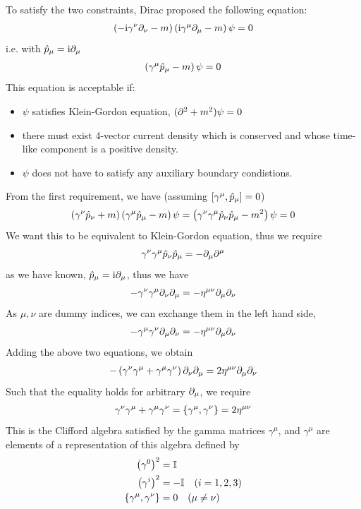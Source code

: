 To satisfy the two constraints, Dirac proposed the following equation: 
\begin{align}
    \left(- \mathrm{i} \gamma^\nu \partial_ \nu - m\right) \left(\mathrm{i} \gamma^ \mu \partial_ \mu - m\right) \psi =0
\end{align}
i.e. with $\hat{p}_ \mu = \mathrm{i} \partial_ \mu$ 
\begin{align}
    \left(\gamma^ \mu \hat{p}_ \mu - m\right) \psi = 0 
\end{align}
This equation is acceptable if: 
\begin{itemize}
    \item $\psi$ satisfies Klein-Gordon equation, $(\partial^2 + m^2) \psi = 0$
    \item there must exist 4-vector current density which is conserved and whose time-like component is a positive density.
    \item $\psi$ does not have to satisfy any auxiliary boundary condistions.
\end{itemize}
From the first requirement, we have (assuming $\left[ \gamma^ \mu , \hat{p}_\mu \right] = 0$)
\begin{align}
    \left(\gamma^ \nu \hat{p}_ \nu + m\right) \left( \gamma^ \mu \hat{p}_ \mu - m \right) \psi = \left( \gamma^ \nu \gamma^ \mu \hat{p}_ \nu \hat{p}_ \mu - m^2 \right)\psi = 0 
\end{align}
We want this to be equivalent to Klein-Gordon equation, thus we require
\begin{align}
    \gamma^ \nu \gamma^ \mu \hat{p}_ \nu \hat{p}_ \mu = - \partial_ \mu \partial^ \mu
\end{align}
as we have known, $\hat{p}_ \mu = \mathrm{i} \partial_ \mu$, thus we have
\begin{align}
    - \gamma^ \nu \gamma^ \mu \partial_ \nu \partial_ \mu = - \eta^{\mu \nu} \partial_ \mu \partial_ \nu
\end{align}
As $\mu, \nu$ are dummy indices, we can exchange them in the left hand side,
\begin{align}
    - \gamma^ \mu \gamma^ \nu \partial_ \mu \partial_ \nu = - \eta^{\mu \nu} \partial_ \mu \partial_ \nu
\end{align}
Adding the above two equations, we obtain
\begin{align}
    - \left(\gamma^ \nu \gamma^ \mu + \gamma^ \mu \gamma^ \nu \right) \partial_ \nu \partial_ \mu = 2 \eta^{\mu \nu} \partial_ \mu \partial_ \nu
\end{align}
Such that the equality holds for arbitrary $\partial_ \mu$, we require
\begin{align}
    \gamma^ \nu \gamma^ \mu + \gamma^ \mu \gamma^ \nu = \left\{ \gamma^\mu , \gamma^\nu \right\} = 2 \eta^{\mu \nu} \label{eq:Clifford_algebra}
\end{align}
This is the Clifford algebra satisfied by the gamma matrices $\gamma^ \mu$, and $\gamma^\mu$ are elements of a representation of this algebra defined by 
\begin{align}
    \left(\gamma^0\right)^2 &= \mathbb{I} \\
    \left(\gamma^i\right)^2 &= - \mathbb{I} \quad (i=1,2,3) \\
    \left\{ \gamma^\mu , \gamma^\nu \right\} &= 0 \quad (\mu \neq \nu) 
\end{align} 

